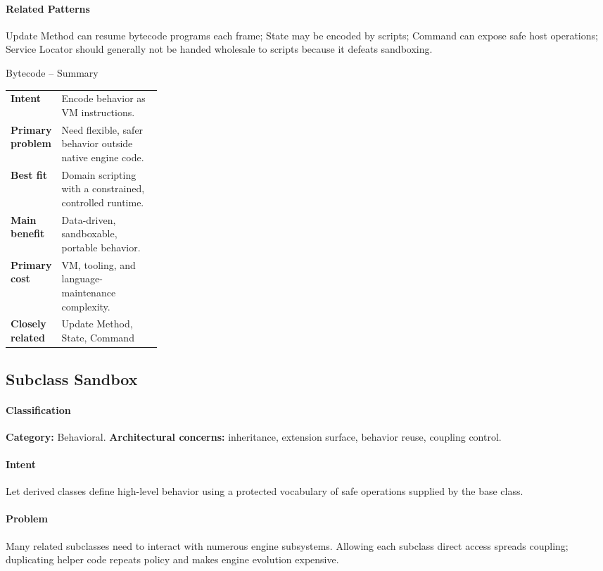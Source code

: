 \documentclass[11pt]{article}
\begin{document}
\paragraph{Related Patterns} Update Method can resume bytecode programs each frame; State may be encoded by scripts; Command can expose safe host operations; Service Locator should generally not be handed wholesale to scripts because it defeats sandboxing.

\begin{patternsummary}{Bytecode -- Summary}
\begin{tabularx}{\linewidth}{@{}>{\bfseries}p{0.25\linewidth}X@{}}
Intent & Encode behavior as VM instructions. \\
Primary problem & Need flexible, safer behavior outside native engine code. \\
Best fit & Domain scripting with a constrained, controlled runtime. \\
Main benefit & Data-driven, sandboxable, portable behavior. \\
Primary cost & VM, tooling, and language-maintenance complexity. \\
Closely related & Update Method, State, Command \\
\end{tabularx}
\end{patternsummary}

\subsection{Subclass Sandbox}\label{pat:subclass-sandbox}
\paragraph{Classification} \textbf{Category:} Behavioral. \textbf{Architectural concerns:} inheritance, extension surface, behavior reuse, coupling control.
\paragraph{Intent} Let derived classes define high-level behavior using a protected vocabulary of safe operations supplied by the base class.
\paragraph{Problem} Many related subclasses need to interact with numerous engine subsystems. Allowing each subclass direct access spreads coupling; duplicating helper code repeats policy and makes engine evolution expensive.
\end{document}
